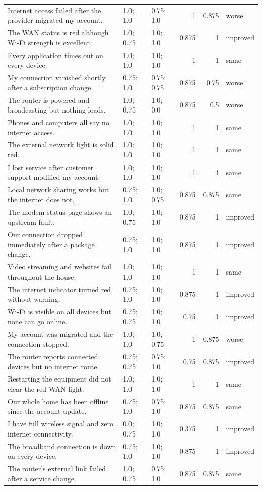 \documentclass[11pt]{article}
\begin{document}
{\begin{longtable}{P{5.6cm}llrrl}
Internet access failed after the provider migrated my account. & 1.0; 1.0 & 0.75; 1.0 & 1 & 0.875 & worse \\
The WAN status is red although Wi-Fi strength is excellent. & 1.0; 0.75 & 1.0; 1.0 & 0.875 & 1 & improved \\
Every application times out on every device. & 1.0; 1.0 & 1.0; 1.0 & 1 & 1 & same \\
My connection vanished shortly after a subscription change. & 0.75; 1.0 & 0.75; 0.75 & 0.875 & 0.75 & worse \\
The router is powered and broadcasting but nothing loads. & 1.0; 0.75 & 1.0; 0.0 & 0.875 & 0.5 & worse \\
Phones and computers all say no internet access. & 1.0; 1.0 & 1.0; 1.0 & 1 & 1 & same \\
The external network light is solid red. & 1.0; 1.0 & 1.0; 1.0 & 1 & 1 & same \\
I lost service after customer support modified my account. & 1.0; 1.0 & 1.0; 1.0 & 1 & 1 & same \\
Local network sharing works but the internet does not. & 0.75; 1.0 & 1.0; 0.75 & 0.875 & 0.875 & same \\
The modem status page shows an upstream fault. & 1.0; 0.75 & 1.0; 1.0 & 0.875 & 1 & improved \\
Our connection dropped immediately after a package change. & 0.75; 1.0 & 1.0; 1.0 & 0.875 & 1 & improved \\
Video streaming and websites fail throughout the house. & 1.0; 1.0 & 1.0; 1.0 & 1 & 1 & same \\
The internet indicator turned red without warning. & 0.75; 1.0 & 1.0; 1.0 & 0.875 & 1 & improved \\
Wi-Fi is visible on all devices but none can go online. & 0.75; 0.75 & 1.0; 1.0 & 0.75 & 1 & improved \\
My account was migrated and the connection stopped. & 1.0; 1.0 & 1.0; 0.75 & 1 & 0.875 & worse \\
The router reports connected devices but no internet route. & 0.75; 0.75 & 0.75; 1.0 & 0.75 & 0.875 & improved \\
Restarting the equipment did not clear the red WAN light. & 1.0; 1.0 & 1.0; 1.0 & 1 & 1 & same \\
Our whole home has been offline since the account update. & 0.75; 1.0 & 0.75; 1.0 & 0.875 & 0.875 & same \\
I have full wireless signal and zero internet connectivity. & 0.0; 0.75 & 1.0; 1.0 & 0.375 & 1 & improved \\
The broadband connection is down on every device. & 0.75; 1.0 & 1.0; 1.0 & 0.875 & 1 & improved \\
The router's external link failed after a service change. & 1.0; 0.75 & 0.75; 1.0 & 0.875 & 0.875 & same \\
\end{longtable}
}
\end{document}
